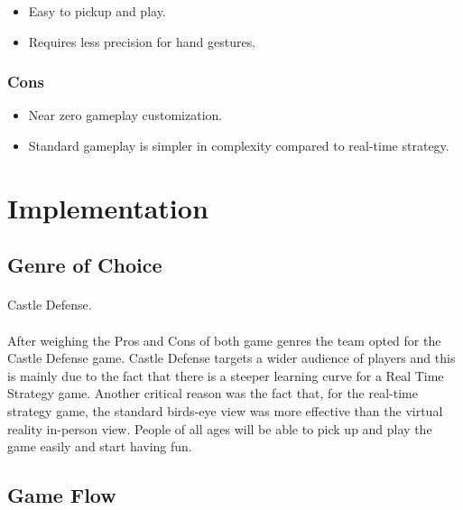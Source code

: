 \begin{itemize}
	\item Easy to pickup and play.
	\item Requires less precision for hand gestures.
\end{itemize}

\subsubsection{Cons}

\begin{itemize}
	\item Near zero gameplay customization.
	\item Standard gameplay is simpler in complexity compared to real-time strategy.
\end{itemize}

\section{Implementation}

\subsection{Genre of Choice}

\paragraph{} Castle Defense.

\paragraph{} After weighing the Pros and Cons of both game genres the team opted for the Castle Defense game. Castle Defense targets a wider audience of players and this is mainly due to the fact that there is a steeper learning curve for a Real Time Strategy game. Another critical reason was the fact that, for the real-time strategy game, the standard birds-eye view was more effective than the virtual reality in-person view. People of all ages will be able to pick up and play the game easily and start having fun.

\subsection{Game Flow}

